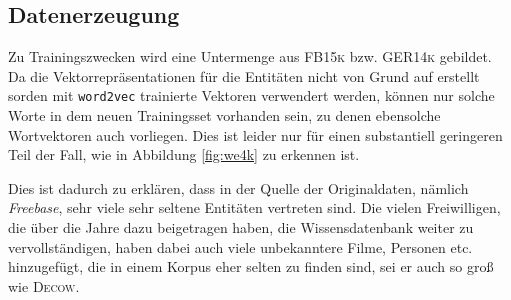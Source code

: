 \subsection{Datenerzeugung}

Zu Trainingszwecken wird eine Untermenge aus \textsc{FB15k} bzw. \textsc{GER14k} gebildet. Da
die Vektorrepräsentationen für die Entitäten nicht von Grund auf erstellt sorden mit
\verb|word2vec| trainierte Vektoren verwendert werden, können nur solche Worte in dem
neuen Trainingsset vorhanden sein, zu denen ebensolche Wortvektoren auch vorliegen.
Dies ist leider nur für einen substantiell geringeren Teil der Fall, wie in Abbildung \ref{fig:we4k} zu
erkennen ist.

\begin{table}[h]
  \centering
  \begin{changemargin}{0cm}{0cm}
\end{changemargin}
  \caption[Daten des neuen Relationsdatensets im Vergleich zu \textsc{FB15k} und \textsc{GER14k}]{Daten des neuen Sets \textsc{WE4k} im Vergleich mit
  \textsc{FB15k} und \textsc{GER14k}. Aufgelistet ist die Anzahl der Tripel (Datensätze), Entitäts- und Relationstypen und die Veränderung
  der Anzahlen in Prozent im Vergleich zu \textsc{FB15k} in Klammern.\label{fig:we4k}}
\end{table}

Dies ist dadurch zu erklären, dass in der Quelle der Originaldaten, nämlich \emph{Freebase},
sehr viele sehr seltene Entitäten vertreten sind. Die vielen Freiwilligen, die über die
Jahre dazu beigetragen haben, die Wissensdatenbank weiter zu vervollständigen, haben dabei auch
viele unbekanntere Filme, Personen etc. hinzugefügt, die in einem Korpus eher selten zu finden sind, sei er auch
so groß wie \textsc{Decow}.\\

